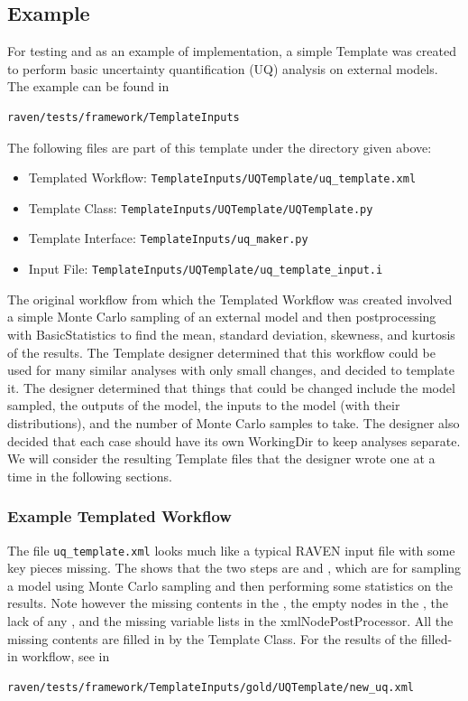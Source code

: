 \subsection{Example}
%
For testing and as an example of implementation, a simple Template was created to perform basic uncertainty
%
quantification (UQ) analysis on external models. The example can be found in
%
\begin{lstlisting}[language=bash]
 raven/tests/framework/TemplateInputs
\end{lstlisting}
%
The following files are part of this template under the directory given above:
%
\begin{itemize}
  \item Templated Workflow: \texttt{TemplateInputs/UQTemplate/uq\_template.xml}
  \item Template Class: \texttt{TemplateInputs/UQTemplate/UQTemplate.py}
  \item Template Interface: \texttt{TemplateInputs/uq\_maker.py}
  \item Input File: \texttt{TemplateInputs/UQTemplate/uq\_template\_input.i}
\end{itemize}
%
The original workflow from which the Templated Workflow was created involved a simple Monte Carlo sampling of an
%
external model and then postprocessing with BasicStatistics to find the mean, standard deviation, skewness, and kurtosis
%
of the results. The Template designer determined that this workflow could be used for many similar analyses with only
%
small changes, and decided to template it. The designer determined that things that could be changed include the model
%
sampled, the outputs of the model, the inputs to the model (with their distributions), and the number of Monte Carlo
%
samples to take. The designer also decided that each case should have its own WorkingDir to keep analyses separate. We
%
will consider the resulting Template files that the designer wrote one at a time in the following sections.



\subsubsection{Example Templated Workflow}
%
The file \texttt{uq\_template.xml} looks much like a typical RAVEN input file with some key pieces missing. The
%
 shows that the two steps are  and , which are for sampling a model
%
using Monte Carlo sampling and then performing some statistics on the results. Note however the missing contents in the
%
, the empty nodes in the , the lack of any , and the
%
missing variable lists in the xmlNode{PostProcessor}. All the missing contents are filled in by the Template Class. For
%
the results of the filled-in workflow, see in
%
\begin{lstlisting}[language=bash]
 raven/tests/framework/TemplateInputs/gold/UQTemplate/new_uq.xml
\end{lstlisting}



